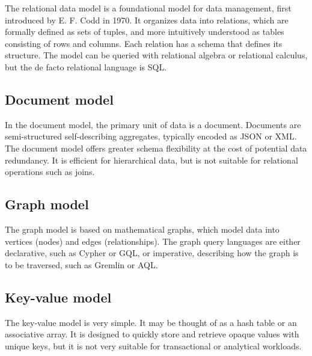 The relational data model is a foundational model for data management, first introduced by E. F. Codd in 1970\cite{codd1970relational}. It organizes data into relations, which are formally defined as sets of tuples, and more intuitively understood as tables consisting of rows and columns. Each relation has a schema that defines its structure. The model can be queried with relational algebra or relational calculus, but the de facto relational language is SQL.

\subsection{Document model}

In the document model, the primary unit of data is a document. Documents are semi-structured self-describing aggregates, typically encoded as JSON or XML. The document model offers greater schema flexibility at the cost of potential data redundancy. It is efficient for hierarchical data, but is not suitable for relational operations such as joins.

\subsection{Graph model}

The graph model is based on mathematical graphs, which model data into vertices (nodes) and edges (relationships). The graph query languages are either declarative, such as Cypher or GQL, or imperative, describing how the graph is to be traversed, such as Gremlin or AQL.

\subsection{Key-value model}

The key-value model is very simple. It may be thought of as a hash table or an associative array. It is designed to quickly store and retrieve opaque values with unique keys, but it is not very suitable for transactional or analytical workloads. 